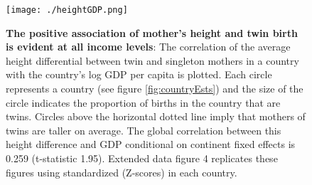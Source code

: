 \documentclass{nature}
\begin{document}
\begin{linenumbers}
\begin{spacing}{1}
\begin{figure}[htpb!]
  \texttt{[image: ./heightGDP.png]}
\vspace{5mm}
\caption{\textbf{The positive association of mother's height and twin birth is evident at all income levels}: {\footnotesize The correlation of the average height differential between twin and singleton  mothers in a country with the country's log GDP per capita is plotted. %
Each circle represents a country (see figure \ref{fig:countryEsts}) and the size of the circle indicates the proportion of births in the country that are twins. Circles above the horizontal dotted line imply that mothers of twins are taller on average. The global correlation between this height difference and GDP conditional on continent fixed effects is 0.259 (t-statistic 1.95). Extended data figure 4 replicates these figures using standardized (Z-scores) in each country.}}
\label{fig:GDPEsts}
\end{figure}




\end{spacing}
\end{linenumbers}
\end{document}
